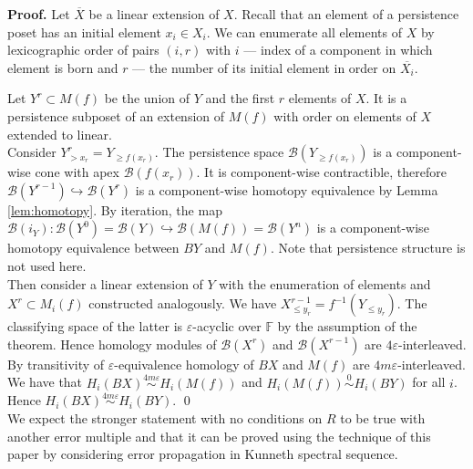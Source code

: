 \documentclass[english,12pt]{article}
\numberwithin{equation}{section}
\theoremstyle{definition}
\theoremstyle{remark}
\newenvironment{pf}{\noindent\textbf{Proof.}}{\qed}
\renewcommand{\leq}{\leqslant}
\renewcommand{\geq}{\geqslant}
\begin{document}
\begin{pf}
  Let $\overline{X}$ be a linear extension of $X$. Recall that an element of a persistence poset has an initial element $x_i \in X_i$. We can enumerate all elements of $X$ by lexicographic order of pairs $(i,r)$ with $i$ --- index of a component in which element is born and $r$ --- the number of its initial element in order on $\overline{X_i}$.

  Let $Y^r \subset M(f)$ be the union of $Y$ and the first $r$ elements of $X$. It is a persistence subposet of an extension of $M(f)$ with order on elements of $X$ extended to linear.\\

  Consider $Y^r_{>x_r} = Y_{\geq f(x_r)}$. The persistence space $\mathcal{B}(Y_{\geq f(x_r)})$ is a component-wise cone with apex $\mathcal{B}(f(x_r))$. It is component-wise contractible, therefore $\mathcal{B}(Y^{r-1}) \hookrightarrow \mathcal{B}(Y^{r})$ is a component-wise homotopy equivalence by Lemma \ref{lem:homotopy}. By iteration, the map $\mathcal{B}(i_Y) : \mathcal{B}(Y^{0}) = \mathcal{B}(Y) \hookrightarrow \mathcal{B}(M(f)) = \mathcal{B}(Y^n)$ is a component-wise homotopy equivalence between $BY$ and $M(f)$. Note that persistence structure is not used here.\\

  Then consider a linear extension of $Y$ with the enumeration of elements and $X^r \subset M_i(f)$ constructed analogously. We have $X^{r-1}_{\leq y_r} = f^{-1}(Y_{\leqslant y_r})$. The classifying space of the latter is $\varepsilon$-acyclic over $\mathbb{F}$ by the assumption of the theorem. Hence homology modules of $\mathcal{B}(X^{r})$ and $\mathcal{B}(X^{r-1})$ are $4\varepsilon$-interleaved. By transitivity of $\varepsilon$-equivalence homology of $BX$ and $M(f)$ are $4m\varepsilon$-interleaved.\\

  We have that $H_i(BX) \stackrel{4m\varepsilon}{\sim} H_i(M(f))$ and $H_i(M(f)) \stackrel{0}{\sim} H_i(BY)$ for all $i$. Hence $H_i(BX) \stackrel{4m\varepsilon}{\sim} H_i(BY)$.
\end{pf}\\

We expect the stronger statement with no conditions on $R$ to be true with another error multiple and that it can be proved using the technique of this paper by considering error propagation in Kunneth spectral sequence.
\end{document}
